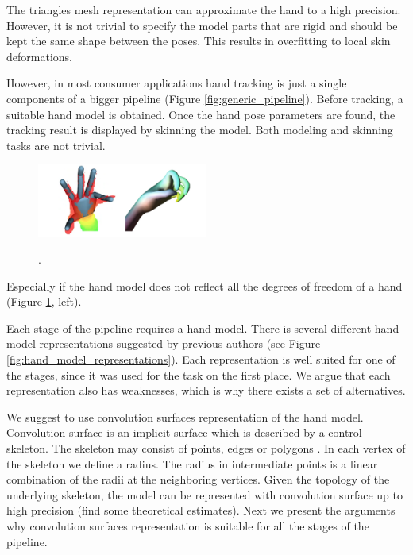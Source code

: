 
The triangles mesh representation can approximate the hand to a high precision. However, it is not trivial to specify the model parts that are rigid and should be kept the same shape between the poses. This results in overfitting to local skin deformations. 

However, in most consumer applications hand tracking is just a single components of a bigger pipeline (Figure \ref{fig:generic_pipeline}). Before tracking, a suitable hand model is obtained. Once the hand pose parameters are found, the tracking result is displayed by skinning the model. Both modeling and skinning tasks are not trivial.

\begin{figure}[h!] 
\centering
\hspace{-2em}
\includegraphics[width=0.5\textwidth]{fig/coarse_hand_model_and_lbs}
\caption{}.
\label{fig:coarse_hand_model_and_lbs}
\end{figure}

Especially if the hand model does not reflect all the degrees of freedom of a hand (Figure \ref{fig:coarse_hand_model_and_lbs}, left).

Each stage of the pipeline requires a hand model. There is several different hand model representations suggested by previous authors (see Figure \ref{fig:hand_model_representations}). Each representation is well suited for one of the stages, since it was used for the task on the first place. We argue that each representation also has weaknesses, which is why there exists a set of alternatives.

We suggest to use convolution surfaces representation of the hand model. Convolution surface is an implicit surface which is described by a control skeleton. The skeleton may consist of points, edges or polygons \cite{bloomenthal1991convolution}. In each vertex of the skeleton we define a radius. The radius in intermediate points is a linear combination of the radii at the neighboring vertices. Given the topology of the underlying skeleton, the model can be represented with convolution surface up to high precision \textcolor{mygray}{(find some theoretical estimates).} Next we present the arguments why convolution surfaces representation is suitable for all the stages of the pipeline.


